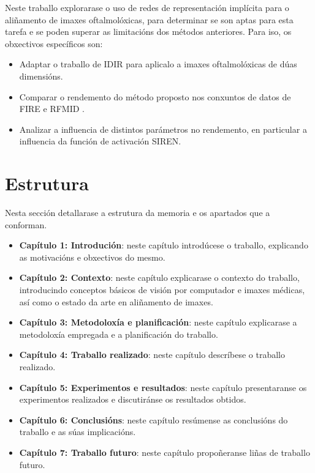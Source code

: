 Neste traballo explorarase o uso de redes de representación implícita para o aliñamento de imaxes oftalmolóxicas, para determinar se son aptas para esta tarefa e se poden superar as limitacións dos métodos anteriores.
Para iso, os obxectivos específicos son:
\begin{itemize}
    \item Adaptar o traballo de IDIR \cite{wolterink2021implicit} para aplicalo a imaxes oftalmolóxicas de dúas dimensións.
    \item Comparar o rendemento do método proposto nos conxuntos de datos de FIRE \cite{FIRE} e RFMID \cite{RFMiD}.
    \item Analizar a influencia de distintos parámetros no rendemento, en particular a influencia da función de activación SIREN.
\end{itemize}

\section{Estrutura }
\label{sec:estrutura}

Nesta sección detallarase a estrutura da memoria e os apartados que a conforman.

\begin{itemize}
    \item \textbf{Capítulo 1: Introdución}: neste capítulo introdúcese o traballo, explicando as motivacións e obxectivos do mesmo.
    \item \textbf{Capítulo 2: Contexto}: neste capítulo explicarase o contexto do traballo, introducindo conceptos básicos de visión por computador e imaxes médicas, así como o estado da arte en aliñamento de imaxes.
    \item \textbf{Capítulo 3: Metodoloxía e planificación}: neste capítulo explicarase a metodoloxía empregada e a planificación do traballo.
    \item \textbf{Capítulo 4: Traballo realizado}: neste capítulo descríbese o traballo realizado.
    \item \textbf{Capítulo 5: Experimentos e resultados}: neste capítulo presentaranse os experimentos realizados e discutiránse os resultados obtidos. 
    \item \textbf{Capítulo 6: Conclusións}: neste capítulo resúmense as conclusións do traballo e as súas implicacións.
    \item \textbf{Capítulo 7: Traballo futuro}: neste capítulo propoñeranse liñas de traballo futuro.
\end{itemize}
